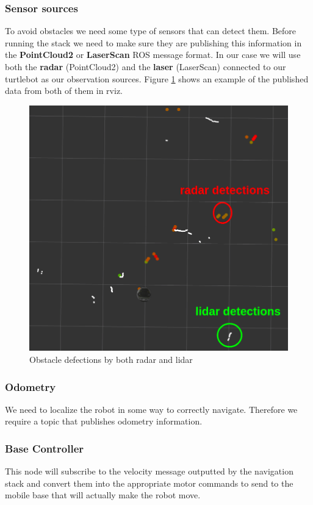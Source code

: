 \documentclass[12pt]{article}
\begin{document}
\subsubsection{Sensor sources}
To avoid obstacles we need some type of sensors that can detect them. Before running the stack we need to make sure they are publishing this information in the \textbf{PointCloud2} or \textbf{LaserScan} ROS message format. In our case we will use both the \textbf{radar} (PointCloud2) and the \textbf{laser} (LaserScan) connected to our turtlebot as our observation sources.
Figure \ref{fig:sensors} shows an example of the published data from both of them in rviz.
\begin{figure}[!htb]
    \centering
    \includegraphics[scale=0.4]{sensors2.png}
    \caption{Obstacle defections by both radar and lidar}
    \label{fig:sensors}
\end{figure}
\subsubsection{Odometry}
We need to localize the robot in some way to correctly navigate. Therefore we require a topic that publishes odometry information.
\subsubsection{Base Controller}
This node will subscribe to the velocity message outputted by the navigation stack and convert them into the appropriate motor commands to send to the mobile base that will actually make the robot move.
\end{document}
